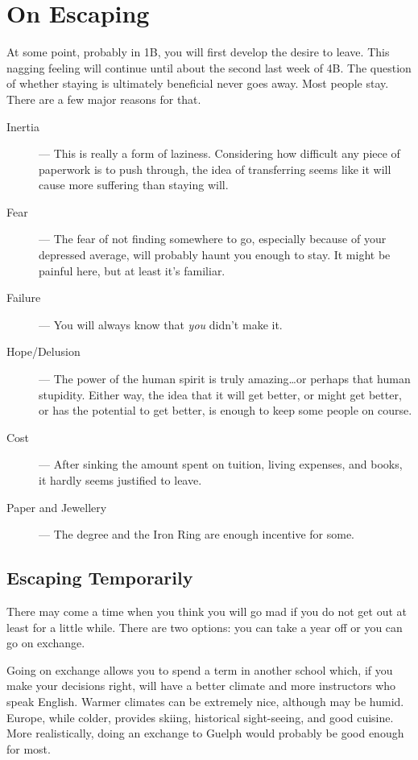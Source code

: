 \documentclass{book}
\begin{document}
\section{On Escaping}
At some point, probably in 1B, you will first develop the desire to leave. This nagging feeling will continue until about the second last week of 4B. The question of whether staying is ultimately beneficial never goes away. Most people stay. There are a few major reasons for that.

\begin{description}
\item[Inertia] --- This is really a form of laziness. Considering how difficult any piece of paperwork is to push through, the idea of transferring seems like it will cause more suffering than staying will.
\item[Fear] --- The fear of not finding somewhere to go, especially because of your depressed average, will probably haunt you enough to stay. It might be painful here, but at least it's familiar.
\item[Failure] ---  You will always know that \emph{you} didn't make it.
\item[Hope/Delusion] --- The power of the human spirit is truly amazing\dots{}or perhaps that human stupidity. Either way, the idea that it will get better, or might get better, or has the potential to get better, is enough to keep some people on course.
\item[Cost] --- After sinking the amount spent on tuition, living expenses, and books, it hardly seems justified to leave.
\item[Paper and Jewellery] --- The degree and the Iron Ring are enough incentive for some.
\end{description}

\subsection{Escaping Temporarily}
There may come a time when you think you will go mad if you do not get out at least for a little while. There are two options: you can take a year off or you can go on exchange.

Going on exchange allows you to spend a term in another school which, if you make your decisions right, will have a better climate and more instructors who speak English. Warmer climates can be extremely nice, although may be humid. Europe, while colder, provides skiing, historical sight-seeing, and good cuisine. More realistically, doing an exchange to Guelph would probably be good enough for most.
\end{document}
